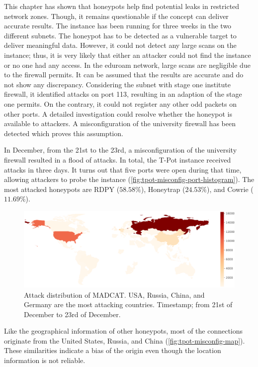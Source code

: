 This chapter has shown that honeypots help find potential leaks in restricted network zones.
Though, it remains questionable if the concept can deliver accurate results.
The instance has been running for three weeks in the two different subnets.
The honeypot has to be detected as a vulnerable target to deliver meaningful data.
However, it could not detect any large scans on the instance; thus, it is very likely that either an attacker could not find the instance or no one had any access.
In the eduroam network, large scans are negligible due to the firewall permits.
It can be assumed that the results are accurate and do not show any discrepancy.
Considering the subnet with stage one institute firewall, it identified attacks on port 113, resulting in an adaption of the stage one permits.
On the contrary, it could not register any other odd packets on other ports.
A detailed investigation could resolve whether the honeypot is available to attackers.
A misconfiguration of the university firewall has been detected which proves this assumption.

In December, from the 21st to the 23rd, a misconfiguration of the university firewall resulted in a flood of attacks.
In total, the T-Pot instance received  attacks in three days.
It turns out that five ports were open during that time, allowing attackers to probe the instance (\autoref{fig:tpot-misconfig-port-histogram}).
The most attacked honeypots are RDPY ($58.58\%$), Honeytrap ($24.53\%$), and Cowrie ($11.69\%$).

\begin{figure}[ht]
    \centering
    \includegraphics[width=\textwidth]{figures/tpot-misconfig-overview-map.pdf}
    \caption[Attack distribution of MADCAT]{
        Attack distribution of MADCAT.
        USA, Russia, China, and Germany are the most attacking countries.
        Timestamp; from 21st of December to 23rd of December.
    }
    \label{fig:tpot-misconfig-map}
\end{figure}

Like the geographical information of other honeypots, most of the connections originate from the United States, Russia, and China (\autoref{fig:tpot-misconfig-map}).
These similarities indicate a bias of the origin even though the location information is not reliable.


